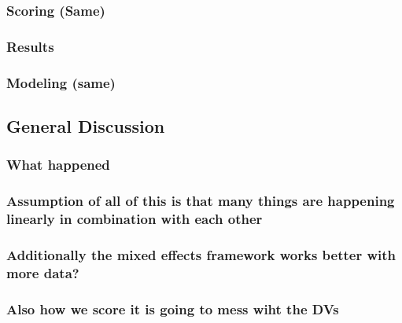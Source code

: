 \documentclass[]{book}
\theoremstyle{definition}
\theoremstyle{definition}
\theoremstyle{definition}
\theoremstyle{remark}
\begin{document}
\hypertarget{scoring-same}{%
\subsubsection{Scoring (Same)}\label{scoring-same}}

\hypertarget{results-2}{%
\subsubsection{Results}\label{results-2}}

\hypertarget{modeling-same}{%
\subsubsection{Modeling (same)}\label{modeling-same}}

\hypertarget{general-discussion}{%
\subsection{General Discussion}\label{general-discussion}}

\hypertarget{what-happened}{%
\subsubsection{What happened}\label{what-happened}}

\hypertarget{assumption-of-all-of-this-is-that-many-things-are-happening-linearly-in-combination-with-each-other}{%
\subsubsection{Assumption of all of this is that many things are
happening linearly in combination with each
other}\label{assumption-of-all-of-this-is-that-many-things-are-happening-linearly-in-combination-with-each-other}}

\hypertarget{additionally-the-mixed-effects-framework-works-better-with-more-data}{%
\subsubsection{Additionally the mixed effects framework works better
with more
data?}\label{additionally-the-mixed-effects-framework-works-better-with-more-data}}

\hypertarget{also-how-we-score-it-is-going-to-mess-wiht-the-dvs}{%
\subsubsection{Also how we score it is going to mess wiht the
DVs}\label{also-how-we-score-it-is-going-to-mess-wiht-the-dvs}}
\end{document}
